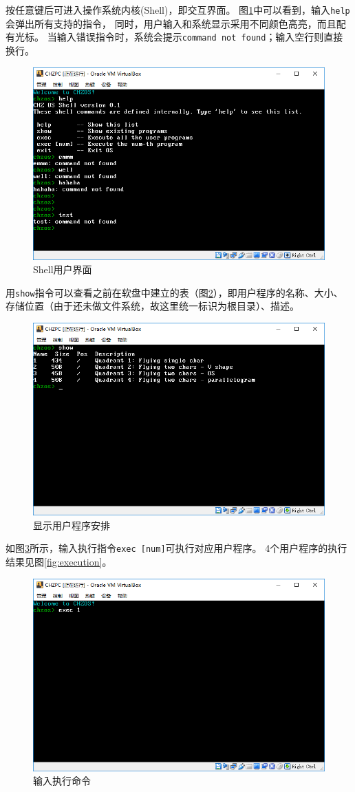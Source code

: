 \documentclass[logo,reportComp]{thesis}
\begin{document}
按任意键后可进入操作系统内核(Shell)，即交互界面。
图\ref{fig:shell}中可以看到，输入\verb'help'会弹出所有支持的指令，
同时，用户输入和系统显示采用不同颜色高亮，而且配有光标。
当输入错误指令时，系统会提示\verb'command not found'；输入空行则直接换行。
\begin{figure}[H]
\centering
\includegraphics[width=0.8\linewidth]{fig/shell.PNG}
\caption{Shell用户界面}
\label{fig:shell}
\end{figure}

用\verb'show'指令可以查看之前在软盘中建立的表（图\ref{fig:organization}），即用户程序的名称、大小、存储位置（由于还未做文件系统，故这里统一标识为根目录）、描述。
\begin{figure}[H]
\centering
\includegraphics[width=0.8\linewidth]{fig/organization.PNG}
\caption{显示用户程序安排}
\label{fig:organization}
\end{figure}

如图\ref{fig:exec}所示，输入执行指令\verb'exec [num]'可执行对应用户程序。
4个用户程序的执行结果见图\ref{fig:execution}。
\begin{figure}[H]
\centering
\includegraphics[width=0.8\linewidth]{fig/exec.PNG}
\caption{输入执行命令}
\label{fig:exec}
\end{figure}
\end{document}
